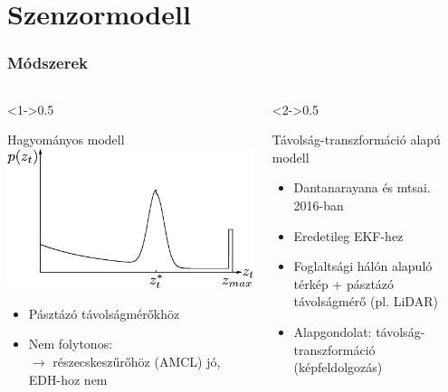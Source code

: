 \documentclass{beamer}
\begin{document}
\section{Szenzormodell}
\begin{frame}
    \frametitle{Módszerek}
    \begin{columns}[t]
        \begin{column}<1->{0.5\textwidth}
            \begin{block}{Hagyományos modell}
                \hspace{1cm}
                \includegraphics[width=\linewidth]{_Figures/beam-model.pdf}
                \begin{itemize}
                    \item Pásztázó távolságmérőkhöz
                    \item Nem folytonos: \\
                          $\to$ részecskeszűrőhöz (AMCL) jó, EDH-hoz nem
                \end{itemize}
            \end{block}
        \end{column}
        \begin{column}<2->{0.5\textwidth}
            \begin{block}{Távolság-transzformáció alapú modell}
                \begin{itemize}
                    \item Dantanarayana és mtsai. 2016-ban
                    \item Eredetileg EKF-hez
                    \item Foglaltsági hálón alapuló térkép + pásztázó távolságmérő (pl. LiDAR)
                    \item Alapgondolat: távolság-transzformáció (képfeldolgozás)
                \end{itemize}
            \end{block}
        \end{column}
    \end{columns}
\end{frame}
\end{document}
